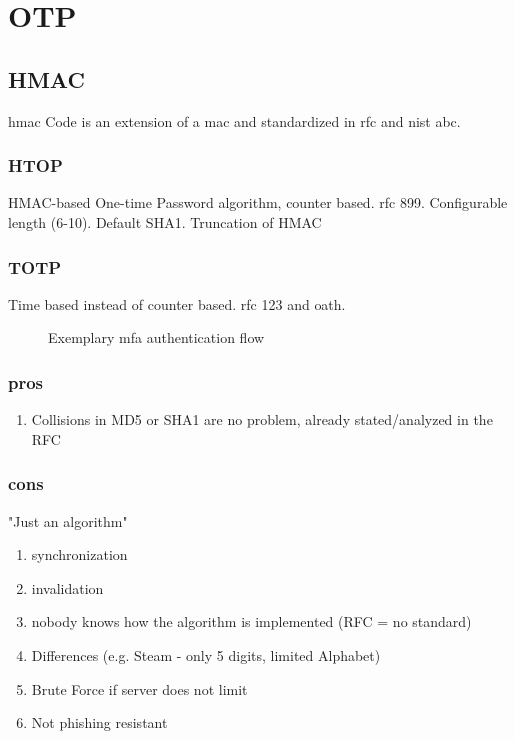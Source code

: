 \section{OTP}

\subsection{HMAC}

\gls{hmac} Code is an extension of a \gls{mac} and standardized in \gls{rfc} and \gls{nist} abc.
\cite{krawczyk1997rfc}
\subsubsection{HTOP}

HMAC-based One-time Password algorithm, counter based. \gls{rfc} 899. Configurable length (6-10). Default SHA1. Truncation of HMAC
\cite{m2005rfc}

\subsubsection{TOTP}

Time based instead of counter based. \gls{rfc} 123 and \gls{oath}.
\cite{m2011rfc}

\begin{figure}[hbt]
	\centering
	
	\caption[Exemplary \gls{mfa} authentication flow]{Exemplary \gls{mfa} authentication flow\footnotemark}
	\label{fig:2fa_flow}
\end{figure}

\subsubsection{pros}

\begin{enumerate}
	\item Collisions in MD5 or SHA1 are no problem, already stated/analyzed in the RFC
\end{enumerate}

\subsubsection{cons}

"Just an algorithm"

\begin{enumerate}
	\item synchronization
	\item invalidation
	\item nobody knows how the algorithm is implemented (RFC = no standard)
	\item Differences (e.g. Steam - only 5 digits, limited Alphabet)
	\item Brute Force if server does not limit
	\item Not phishing resistant
\end{enumerate}